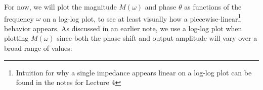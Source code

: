 \documentclass[letterpaper]{article}
\theoremstyle{remark}
\DeclarePairedDelimiter\abs{\lvert}{\rvert}%
\begin{document}
For now, we will plot the magnitude $M(\omega)$ and phase $\theta$ as functions of the frequency $\omega$ on a log-log plot, to see at least visually how a piecewise-linear\footnote{Intuition for why a single impedance appears linear on a log-log plot can be found in the notes for Lecture 4} behavior appears. As discussed in an earlier note, we use a log-log plot when plotting $M(\omega)$ since both the phase shift and output amplitude will vary over a broad range of values:
\begin{center}
\end{center}
\end{document}
